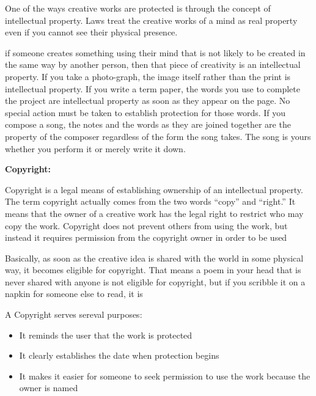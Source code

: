 \documentclass{report}
\begin{document}
    \bigbreak \noindent 
    One of the ways creative works are protected is through the concept of intellectual property. Laws treat the creative works of a mind as real property even if you cannot see their physical presence.

    \bigbreak \noindent 
    if someone creates something using their mind that is not likely to be created in the same way by another person, then that piece of creativity is an intellectual property. If you take a photo-graph, the image itself rather than the print is intellectual property. If you write a term paper, the words you use to complete the project are intellectual property as soon as they appear on the page. No special action must be taken to establish protection for those words. If you compose a song, the notes and the words as they are joined together are the property of the composer regardless of the form the song takes. The song is yours whether you perform it or merely write it down.

    \bigbreak \noindent \bigbreak \noindent \bigbreak \noindent 
    \begin{Large}
        \textbf{Copyright:}
    \end{Large}

    \bigbreak \noindent 
    Copyright is a legal means of establishing ownership of an intellectual property. The term copyright actually comes from the two words “copy” and “right.” It means that the owner of a creative work has the legal right to restrict who may copy the work. Copyright does not prevent others from using the work, but instead it requires permission from the copyright owner in order to be used

    \bigbreak \noindent 
    Basically, as soon as the creative idea is shared with the world in some physical way, it becomes eligible for copyright. That means a poem in your head that is never shared with anyone is not eligible for copyright, but if you scribble it on a napkin for someone else to read, it is

    \bigbreak \noindent 

    \bigbreak \noindent 
    A Copyright serves sereval purposes:

    \bigbreak \noindent 
    \begin{itemize}
        \item It reminds the user that the work is protected
        \item It clearly establishes the date when protection begins
        \item It makes it easier for someone to seek permission to use the work because the 
            owner is named
    \end{itemize}
\end{document}
